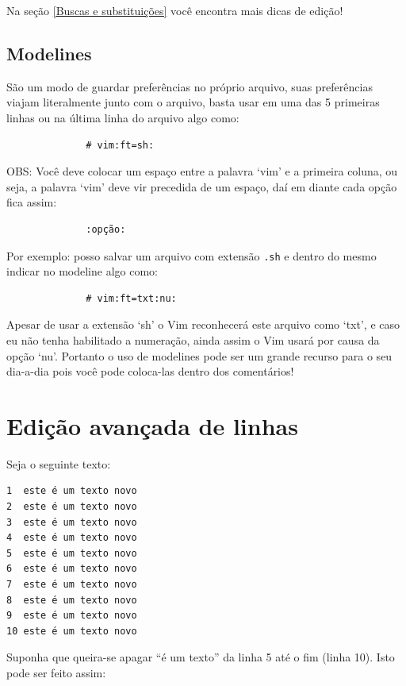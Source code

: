 \documentclass[10pt,a4paper,openany]{book}
\begin{document}
Na seção \ref{Buscas e substituições} você encontra mais dicas de edição!


\subsection{Modelines}\label{sec:Modelines}

São um modo de guardar preferências no próprio arquivo, suas
preferências viajam literalmente junto com o arquivo, basta usar em
uma das 5 primeiras linhas ou na última linha do arquivo algo
como:

\begin{verbatim}
			  # vim:ft=sh:
\end{verbatim}

OBS: Você deve colocar um espaço entre a palavra `vim' e a primeira
coluna, ou seja, a palavra `vim' deve vir precedida de um espaço, daí
em diante cada opção fica assim:

\begin{verbatim}
			  :opção:
\end{verbatim}

Por exemplo: posso salvar um arquivo com extensão \verb|.sh| e dentro do
mesmo indicar no modeline algo como:

\begin{verbatim}
			  # vim:ft=txt:nu:
\end{verbatim}

Apesar de usar a extensão `sh' o Vim reconhecerá este arquivo como `txt', e
caso eu não tenha habilitado a numeração, ainda assim o Vim usará por causa da
opção `nu'.  Portanto o uso de modelines  pode ser um grande recurso para o seu
dia-a-dia pois você pode coloca-las dentro dos comentários!

\section{Edição avançada de linhas}

Seja o seguinte texto:

\begin{verbatim}
1  este é um texto novo
2  este é um texto novo
3  este é um texto novo
4  este é um texto novo
5  este é um texto novo
6  este é um texto novo
7  este é um texto novo
8  este é um texto novo
9  este é um texto novo
10 este é um texto novo
\end{verbatim}

Suponha que queira-se apagar ``é um texto'' da linha 5 até o fim (linha 10). Isto pode ser feito
assim: 
\end{document}
